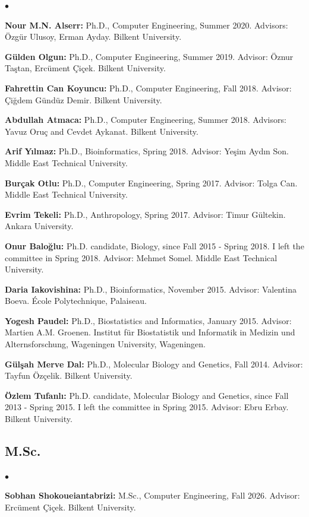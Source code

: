 \documentclass[margin,line]{res}
\newenvironment{list2}{
  \begin{list}{$\bullet$}{%
      \setlength{\itemsep}{0.1cm}
      \setlength{\parsep}{0in} \setlength{\parskip}{0in}
      \setlength{\topsep}{0in} \setlength{\partopsep}{0in} 
      \setlength{\leftmargin}{0.2in}}}{\end{list}}
\begin{document}
\begin{resume}
\begin{list2}
\item 
{\bf  Nour M.N. Alserr:} Ph.D., Computer Engineering, Summer 2020.
  Advisors: Özgür Ulusoy, Erman Ayday.
  Bilkent University.
\item
  {\bf Gülden Olgun:} Ph.D., Computer Engineering, Summer 2019.
  Advisor: Öznur Taştan, Ercüment Çiçek.
  Bilkent University.
\item
  {\bf Fahrettin Can Koyuncu:} Ph.D., Computer Engineering, Fall 2018.
  Advisor: Çiğdem Gündüz Demir.
  Bilkent University.
\item
  {\bf Abdullah Atmaca:} Ph.D., Computer Engineering, Summer 2018.
  Advisors: Yavuz Oruç and Cevdet Aykanat.
  Bilkent University.
\item
  {\bf Arif Yılmaz:} Ph.D., Bioinformatics, Spring 2018.
  Advisor: Yeşim Aydın Son.
  Middle East Technical University.
\item 
  {\bf Burçak Otlu:} Ph.D., Computer Engineering, Spring 2017.
  Advisor: Tolga Can.
  Middle East Technical University. 
\item 
  {\bf Evrim Tekeli:} Ph.D., Anthropology,  Spring 2017.
  Advisor: Timur G\"{u}ltekin.
  Ankara University. 
\item
  {\bf Onur Baloğlu:} Ph.D. candidate, Biology, since Fall 2015 - Spring 2018. I left the committee in Spring 2018.
  Advisor: Mehmet Somel.
  Middle East Technical University.
\item
  {\bf Daria Iakovishina:} Ph.D., Bioinformatics,  November 2015.
  Advisor:  Valentina Boeva.
  École Polytechnique, Palaiseau. %


\item
  {\bf Yogesh Paudel:} Ph.D., Biostatistics and Informatics,  January 2015.
  Advisor: Martien A.M. Groenen.
  Institut für Biostatistik und Informatik in Medizin und Alternsforschung,  Wageningen University, Wageningen.%
  
\item
  {\bf G\"{u}l\c{s}ah Merve Dal:} Ph.D., Molecular Biology and Genetics, Fall 2014.
  Advisor: Tayfun Özçelik.
  Bilkent University. 
\item
  {\bf Özlem Tufanlı:} Ph.D. candidate, Molecular Biology and Genetics, since Fall 2013 - Spring 2015. I left the committee in Spring 2015.
  Advisor: Ebru Erbay.
  Bilkent University.
  \end{list2}

\vspace*{-.4cm}
\subsection{\small \sc M.Sc.}
\begin{list2}
\item
  {\bf Sobhan Shokoueiantabrizi:} M.Sc., Computer Engineering, Fall 2026.
  Advisor: Ercüment Çiçek.
  Bilkent University.


\end{list2}
\end{resume}
\end{document}
